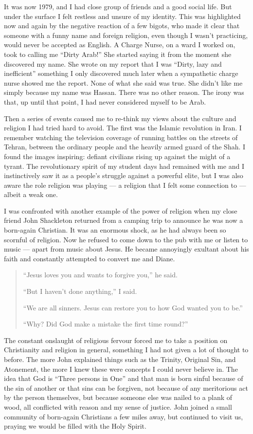 \documentclass[12pt]{memoir}
\begin{document}
It was now 1979, and I had close group of friends and a good social life.
But under the surface I felt restless and unsure of my identity.
This was highlighted now and again by the negative reaction of a few bigots,
who made it clear that someone with a funny name and foreign religion,
even though I wasn’t practicing, would never be accepted as English.
A Charge Nurse, on a ward I worked on, took to calling me “Dirty Arab!”
She started saying it from the moment she discovered my name.
She wrote on my report that I was “Dirty, lazy and inefficient”
something I only discovered much later
when a sympathetic charge nurse showed me the report.
None of what she said was true.
She didn’t like me simply because my name was Hassan.
There was no other reason.
The irony was that, up until that point,
I had never considered myself to be Arab.

Then a series of events caused me to re-think my views
about the culture and religion I had tried hard to avoid.
The first was the Islamic revolution in Iran.
I remember watching the television coverage of running battles
on the streets of Tehran, between the ordinary people
and the heavily armed guard of the Shah.
I found the images inspiring:
defiant civilians rising up against the might of a tyrant.
The revolutionary spirit of my student days had remained with me
and I instinctively saw it as a people’s struggle against a powerful elite,
but I was also aware the role religion was playing —
a religion that I felt some connection to — albeit a weak one.

I was confronted with another example of the power of religion
when my close friend John Shackleton returned from a camping trip
to announce he was now a born-again Christian.
It was an enormous shock, as he had always been so scornful of religion.
Now he refused to come down to the pub with me or listen to music —
apart from music about Jesus.
He became annoyingly exultant about his faith
and constantly attempted to convert me and Diane.

\begin{quote}
“Jesus loves you and wants to forgive you,” he said.

“But I haven’t done anything,” I said.

“We are all sinners. Jesus can restore you to how God wanted you to be.”

“Why? Did God make a mistake the first time round?”
\end{quote}

The constant onslaught of religious fervour forced me
to take a position on Christianity and religion in general,
something I had not given a lot of thought to before.
The more John explained things such as the Trinity, Original Sin,
and Atonement, the more I knew these were concepts I could never believe in.
The idea that God is “Three persons in One” and that man is born sinful
because of the sin of another or that sins can be forgiven,
not because of any meritorious act by the person themselves,
but because someone else was nailed to a plank of wood,
all conflicted with reason and my sense of justice.
John joined a small community of born-again Christians a few miles away,
but continued to visit us, praying we would be filled with the Holy Spirit.
\end{document}
